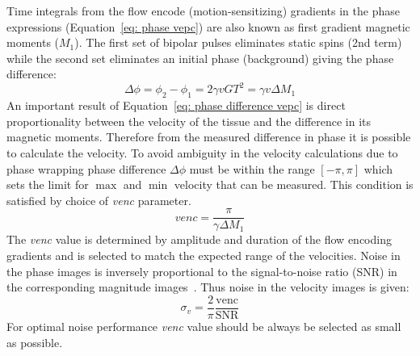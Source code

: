 Time integrals from the flow encode (motion-sensitizing) gradients in the phase expressions (Equation~\ref{eq: phase vepc}) are also known as first gradient magnetic moments ($M_1$). 
The first set of bipolar pulses eliminates static spins (2nd term) while the second set eliminates an initial phase (background) giving the phase difference:
\begin{equation}\label{eq: phase difference vepc}
\Delta\phi=\phi_2-\phi_1=2\gamma v G T^2=\gamma v \Delta M_1
\end{equation}
An important result of Equation~\ref{eq: phase difference vepc} is direct proportionality between the velocity of the tissue and the difference in its magnetic moments.
Therefore from the measured difference in phase it is possible to calculate the velocity.
To avoid ambiguity in the velocity calculations due to phase wrapping phase difference $\Delta\phi$ must be within the range $\left[ -\pi, \pi \right]$ which sets the limit for $\max$ and $\min$ velocity that can be measured.
This condition is satisfied by choice of \textit{venc} parameter.
\begin{equation}\label{eq: venc}
venc = \frac{\pi}{\gamma \Delta M_1}
\end{equation}
The \textit{venc} value is determined by amplitude and duration of the flow encoding gradients and is selected to match the expected range of the velocities. 
Noise in the phase images is inversely proportional to the signal-to-noise ratio (SNR) in the corresponding magnitude images~\cite{Pelc:1991vr}.
Thus noise in the velocity images is given:
\begin{equation}\label{eq: SNR}
\sigma_v = \frac{2}{\pi} \frac{\mathrm{venc}}{\mathrm{SNR}}
\end{equation}
For optimal noise performance \textit{venc} value should be always be selected as small as possible.

